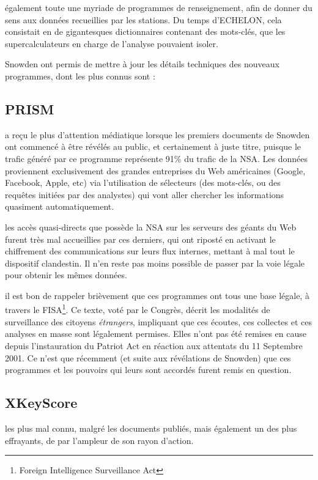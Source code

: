  également toute une myriade de programmes de
renseignement, afin de donner du sens aux données recueillies par les stations.
Du temps d'ECHELON, cela consistait en de gigantesques dictionnaires contenant
des mots-clés, que les supercalculateurs en charge de l'analyse pouvaient
isoler.

 Snowden ont permis de mettre à jour les détails
techniques des nouveaux programmes, dont les plus connus sont :

\subsection{PRISM}
 a reçu le plus d'attention médiatique
lorsque les premiers documents de Snowden ont commencé à être révélés au public,
et certainement à juste titre, puisque le trafic généré par ce programme
représente 91\% du trafic de la NSA\autocite{WP91}. Les données proviennent
exclusivement des grandes entreprises du Web américaines (Google, Facebook,
Apple, etc) via l'utilisation de sélecteurs (des mots-clés, ou des requêtes
initiées par des analystes) qui vont aller chercher les informations quasiment
automatiquement.

 les accès quasi-directs que possède la NSA sur
les serveurs des géants du Web furent très mal accueillies par ces derniers, qui
ont riposté en activant le chiffrement des communications sur leurs flux
internes\autocite{WPGoogle}, mettant à mal tout le dispositif clandestin. Il n'en
reste pas moins possible de passer par la voie légale pour obtenir les mêmes
données.

 il est bon de rappeler brièvement que ces programmes ont
tous une base légale, à travers le FISA\footnote{Foreign Intelligence
Surveillance Act}. Ce texte, voté par le Congrès, décrit les modalités de
surveillance des citoyens \emph{étrangers}, impliquant que ces écoutes, ces
collectes et ces analyses en masse sont légalement permises. Elles n'ont pas
été remises en cause depuis l'instauration du Patriot Act en réaction aux attentats du 11 Septembre 2001.
Ce n'est que récemment (et suite aux révélations de Snowden) que ces programmes
et les pouvoirs qui leurs sont accordés furent remis en question.

\subsection{XKeyScore}
 les plus mal connu, malgré les
documents publiés, mais également un des plus effrayants, de par l'ampleur de
son rayon d'action. 

